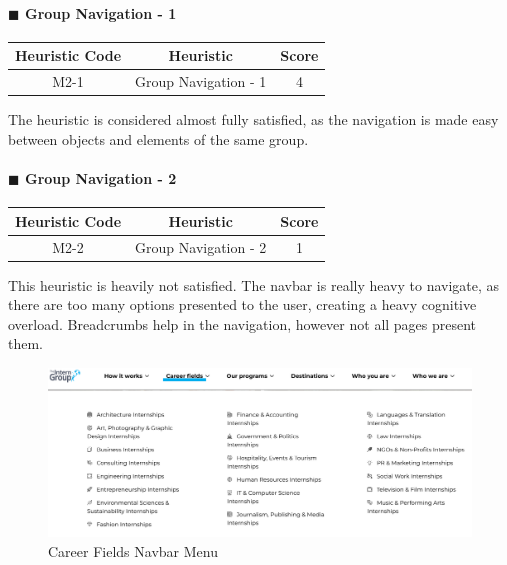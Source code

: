 \documentclass[11pt]{article} %
\begin{document}
\paragraph{$\blacksquare$ Group Navigation - 1}
\begin{center}
    \begin{tabular}{|c|c|c|} 
    \hline
    \textbf{Heuristic Code} & \textbf{Heuristic} & \textbf{Score}\\ 
    \hline
    M2-1 & Group Navigation - 1 & 4 \\
    \hline
    \end{tabular}
\end{center}
The heuristic is considered almost fully satisfied, as the navigation is made easy between objects and elements of the same group. 

\paragraph{$\blacksquare$ Group Navigation - 2}
\begin{center}
    \begin{tabular}{|c|c|c|} 
    \hline
    \textbf{Heuristic Code} & \textbf{Heuristic} & \textbf{Score}\\ 
    \hline
    M2-2 & Group Navigation - 2 & 1 \\
    \hline
    \end{tabular}
\end{center}
This heuristic is heavily not satisfied. The navbar is really heavy to navigate, as there are too many options presented to the user, creating a heavy cognitive overload. Breadcrumbs help in the navigation, however not all pages present them. 

\begin{figure}[H]
  \centering
  \includegraphics[width=\textwidth]{Images/Screenshots/Career Fields Navbar.png}
  \caption{Career Fields Navbar Menu}
\end{figure}
\end{document}
